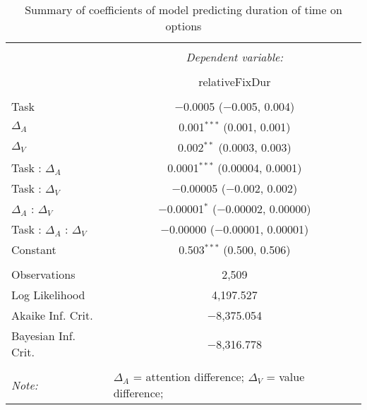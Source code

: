 
\begin{table}[!b] \centering 
  \caption{Summary of coefficients of model predicting duration of time on options} 
  \label{table:durFixModel} 
\begin{tabular}{@{\extracolsep{5pt}}lc} 
\\[-1.8ex]\hline 
\hline \\[-1.8ex] 
 & \multicolumn{1}{c}{\textit{Dependent variable:}} \\ 
\cline{2-2} 
\\[-1.8ex] & relativeFixDur \\ 
\hline \\[-1.8ex] 
 Task & $-$0.0005 ($-$0.005, 0.004) \\ 
  $\Delta_A$ & 0.001$^{***}$ (0.001, 0.001) \\ 
  $\Delta_V$ & 0.002$^{**}$ (0.0003, 0.003) \\ 
  Task : $\Delta_A$ & 0.0001$^{***}$ (0.00004, 0.0001) \\ 
  Task : $\Delta_V$ & $-$0.00005 ($-$0.002, 0.002) \\ 
  $\Delta_A$ : $\Delta_V$ & $-$0.00001$^{*}$ ($-$0.00002, 0.00000) \\ 
  Task : $\Delta_A$ :  $\Delta_V$ & $-$0.00000 ($-$0.00001, 0.00001) \\ 
  Constant & 0.503$^{***}$ (0.500, 0.506) \\ 
 \hline \\[-1.8ex] 
Observations & 2,509 \\ 
Log Likelihood & 4,197.527 \\ 
Akaike Inf. Crit. & $-$8,375.054 \\ 
Bayesian Inf. Crit. & $-$8,316.778 \\ 
\hline 
\hline \\[-1.8ex] 
\textit{Note:}  & \multicolumn{1}{l}{\footnotesize $\Delta_A$ = attention difference; $\Delta_V$ = value difference; } \\ 
\end{tabular} 
\end{table} 
